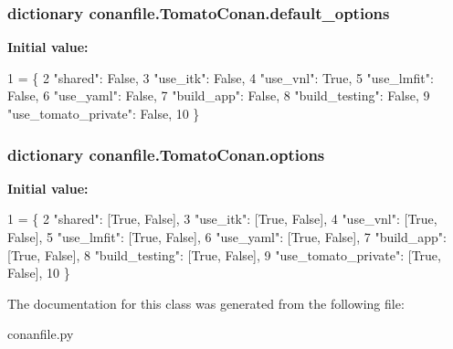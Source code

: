 \subsubsection[{\texorpdfstring{default\+\_\+options}{default_options}}]{\setlength{\rightskip}{0pt plus 5cm}dictionary conanfile.\+Tomato\+Conan.\+default\+\_\+options\hspace{0.3cm}{\ttfamily [static]}}\hypertarget{classconanfile_1_1_tomato_conan_a29503a3b385bfdc7deb5dc266624b630}{}\label{classconanfile_1_1_tomato_conan_a29503a3b385bfdc7deb5dc266624b630}
{\bfseries Initial value\+:}
\begin{DoxyCode}
1 = \{
2         \textcolor{stringliteral}{"shared"}: \textcolor{keyword}{False},
3         \textcolor{stringliteral}{"use\_itk"}: \textcolor{keyword}{False},
4         \textcolor{stringliteral}{"use\_vnl"}: \textcolor{keyword}{True},
5         \textcolor{stringliteral}{"use\_lmfit"}: \textcolor{keyword}{False},
6         \textcolor{stringliteral}{"use\_yaml"}: \textcolor{keyword}{False},
7         \textcolor{stringliteral}{"build\_app"}: \textcolor{keyword}{False},
8         \textcolor{stringliteral}{"build\_testing"}: \textcolor{keyword}{False},
9         \textcolor{stringliteral}{"use\_tomato\_private"}: \textcolor{keyword}{False},
10     \}
\end{DoxyCode}
\subsubsection[{\texorpdfstring{options}{options}}]{\setlength{\rightskip}{0pt plus 5cm}dictionary conanfile.\+Tomato\+Conan.\+options\hspace{0.3cm}{\ttfamily [static]}}\hypertarget{classconanfile_1_1_tomato_conan_adcb0f901242c4b6bf4bc216596cb077d}{}\label{classconanfile_1_1_tomato_conan_adcb0f901242c4b6bf4bc216596cb077d}
{\bfseries Initial value\+:}
\begin{DoxyCode}
1 = \{
2         \textcolor{stringliteral}{"shared"}: [\textcolor{keyword}{True}, \textcolor{keyword}{False}],
3         \textcolor{stringliteral}{"use\_itk"}: [\textcolor{keyword}{True}, \textcolor{keyword}{False}],
4         \textcolor{stringliteral}{"use\_vnl"}: [\textcolor{keyword}{True}, \textcolor{keyword}{False}],
5         \textcolor{stringliteral}{"use\_lmfit"}: [\textcolor{keyword}{True}, \textcolor{keyword}{False}],
6         \textcolor{stringliteral}{"use\_yaml"}: [\textcolor{keyword}{True}, \textcolor{keyword}{False}],
7         \textcolor{stringliteral}{"build\_app"}: [\textcolor{keyword}{True}, \textcolor{keyword}{False}],
8         \textcolor{stringliteral}{"build\_testing"}: [\textcolor{keyword}{True}, \textcolor{keyword}{False}],
9         \textcolor{stringliteral}{"use\_tomato\_private"}: [\textcolor{keyword}{True}, \textcolor{keyword}{False}],
10     \}
\end{DoxyCode}


The documentation for this class was generated from the following file\+:\begin{DoxyCompactItemize}
\item 
conanfile.\+py\end{DoxyCompactItemize}
